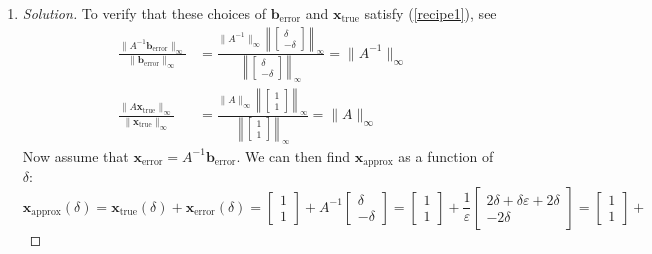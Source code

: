 \documentclass{article}
\newcommand{\ep}{{\varepsilon}}
\begin{document}
\begin{enumerate}
\begin{proof}[Solution]
\[		\]
	\end{proof}
	\item \begin{proof}[Solution]\let\qed\relax
		To verify that these choices of $\mathbf{b}_{\text{error}}$
		and $\mathbf{x}_{\text{true}}$ satisfy (\ref{recipe1}), see
		\begin{align*}
			\frac{\lVert A^{-1} \mathbf{b}_{\text{error}}\rVert_\infty}
			{\lVert \mathbf{b}_{\text{error}}\rVert_\infty}
			&= \frac{\lVert A^{-1}\rVert_\infty
			\left\lVert \begin{bmatrix} \delta \\ -\delta \end{bmatrix} \right\rVert_\infty}
			{\left\lVert \begin{bmatrix} \delta \\ -\delta \end{bmatrix} \right\rVert_\infty}
			= \lVert A^{-1} \rVert_\infty\\
			\frac{\lVert A\mathbf{x}_{\text{true}}\rVert_\infty}
			{\lVert \mathbf{x}_{\text{true}}\rVert_\infty}
			&= \frac{\lVert A\rVert_\infty
			\left\lVert \begin{bmatrix} 1 \\ 1 \end{bmatrix} \right\rVert_\infty}
			{\left\lVert \begin{bmatrix} 1 \\ 1 \end{bmatrix} \right\rVert_\infty}
			= \lVert A \rVert_\infty
		\end{align*}
		Now assume that $\mathbf{x}_{\text{error}}= A^{-1} \mathbf{b}_{\text{error}}$.
		We can then find $\mathbf{x}_{\text{approx}}$ as a function of $\delta$:
		\[
			\mathbf{x}_{\text{approx}}(\delta)
			= \mathbf{x}_{\text{true}}(\delta) + \mathbf{x}_{\text{error}}(\delta)
			= \begin{bmatrix} 1 \\ 1 \end{bmatrix}
			+ A^{-1} \begin{bmatrix} \delta \\ -\delta \end{bmatrix}
			= \begin{bmatrix} 1 \\ 1 \end{bmatrix} + \frac{1}{\ep}
			\begin{bmatrix} 2\delta+\delta\ep + 2\delta \\ -2\delta \end{bmatrix} 
			= \begin{bmatrix} 1 \\ 1 \end{bmatrix} +
\]
\end{proof}
\end{enumerate}
\end{document}
